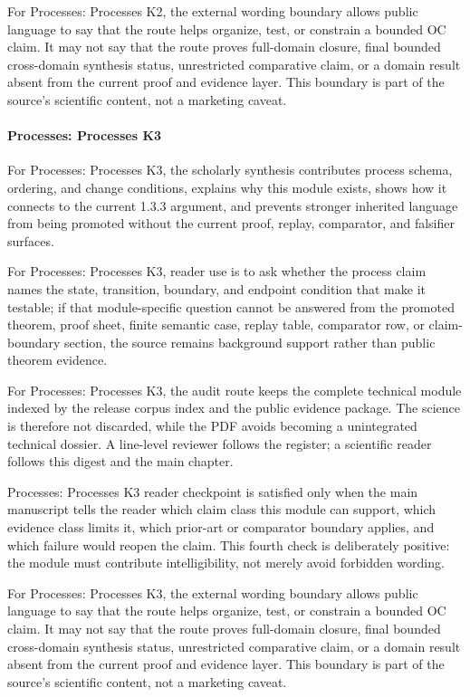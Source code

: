 For Processes: Processes K2, the external wording boundary allows public language to say that the route helps organize, test, or constrain a bounded OC claim. It may not say that the route proves full-domain closure, final bounded cross-domain synthesis status, unrestricted comparative claim, or a domain result absent from the current proof and evidence layer. This boundary is part of the source's scientific content, not a marketing caveat.


\paragraph{Processes: Processes K3}

For Processes: Processes K3, the scholarly synthesis contributes process schema, ordering, and change conditions, explains why this module exists, shows how it connects to the current 1.3.3 argument, and prevents stronger inherited language from being promoted without the current proof, replay, comparator, and falsifier surfaces.


For Processes: Processes K3, reader use is to ask whether the process claim names the state, transition, boundary, and endpoint condition that make it testable; if that module-specific question cannot be answered from the promoted theorem, proof sheet, finite semantic case, replay table, comparator row, or claim-boundary section, the source remains background support rather than public theorem evidence.


For Processes: Processes K3, the audit route keeps the complete technical module indexed by the release corpus index and the public evidence package. The science is therefore not discarded, while the PDF avoids becoming a unintegrated technical dossier. A line-level reviewer follows the register; a scientific reader follows this digest and the main chapter.


Processes: Processes K3 reader checkpoint is satisfied only when the main manuscript tells the reader which claim class this module can support, which evidence class limits it, which prior-art or comparator boundary applies, and which failure would reopen the claim. This fourth check is deliberately positive: the module must contribute intelligibility, not merely avoid forbidden wording.


For Processes: Processes K3, the external wording boundary allows public language to say that the route helps organize, test, or constrain a bounded OC claim. It may not say that the route proves full-domain closure, final bounded cross-domain synthesis status, unrestricted comparative claim, or a domain result absent from the current proof and evidence layer. This boundary is part of the source's scientific content, not a marketing caveat.


